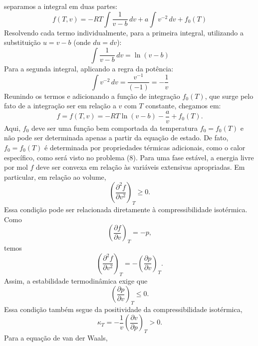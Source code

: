 \documentclass[11pt,a4paper]{article}
\newcommand{\pd}[2]{\frac{\partial #1}{\partial #2}}
\newcommand{\pdd}[2]{\frac{\partial^2 #1}{\partial #2^2}}
\begin{document}
%
separamos a integral em duas partes:
%
\begin{equation}
    f(T,v) = -RT \int \frac{1}{v-b}\,dv + a \int v^{-2}\,dv +
    f_0(T)
\end{equation}
%
Resolvendo cada termo individualmente, para a primeira integral, utilizando a substituição 
%
$u = v-b$ (onde $du = dv$):
%
\begin{equation}
\int \frac{1}{v-b}\,dv = \ln(v-b)
\end{equation}
%
Para a segunda integral, aplicando a regra da potência:
%
\begin{equation}
\int v^{-2}\,dv = \frac{v^{-1}}{(-1)} = -\frac{1}{v}
\end{equation}
%
Reunindo os termos e adicionando a função de integração $f_0(T)$, que surge pelo fato de a integração ser em relação a $v$ com $T$ constante, chegamos em:
%
\begin{equation}
    \boxed{
    f = f(T,v)
    =
    -RT\ln(v-b)
    -\frac{a}{v}
    +f_0(T).
    }
    \label{eq:free_energy}
\end{equation}
%
Aqui, $f_0$ deve ser uma função bem comportada da temperatura $f_0 = f_0(T)$ e não pode ser determinada apenas a partir da equação de estado. De fato, $f_0=f_0(T)$ é determinada por propriedades térmicas adicionais, como o calor específico, como será visto no problema (8).
%
Para uma fase estável, a energia livre por mol $f$ deve ser convexa em relação às variáveis extensivas apropriadas. Em particular, em relação ao volume,
%
\begin{equation}
    \left(\pdd{f}{v}\right)_T\geq0.
\end{equation}
%
Essa condição pode ser relacionada diretamente à compressibilidade
isotérmica. Como
%
\begin{equation}
    \left(\pd{f}{v}\right)_T=-p,
\end{equation}
%
temos
%
\begin{equation}
    \left(\pdd{f}{v}\right)_T
    =
    -\left(\pd{p}{v}\right)_T.
\end{equation}
%
Assim, a estabilidade termodinâmica exige que
%
\begin{equation}
    \left(\pd{p}{v}\right)_T\leq0.
\end{equation}
%
Essa condição também segue da positividade da compressibilidade
isotérmica,
%
\begin{equation}
    \kappa_T
    =
    -\frac{1}{v}
    \left(\frac{\partial v}{\partial p}\right)_T
    >0.
\end{equation}
%
Para a equação de van der Waals,
\end{document}
